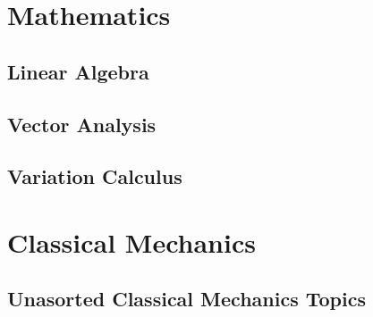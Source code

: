 \documentclass[10pt]{report}
\begin{document}
\chapter*{Mathematics}
\section*{Linear Algebra}
\clearpage

\section*{Vector Analysis}
\clearpage

\section*{Variation Calculus}
\clearpage

\chapter*{Classical Mechanics}
\section*{Unasorted Classical Mechanics Topics}



\end{document}
